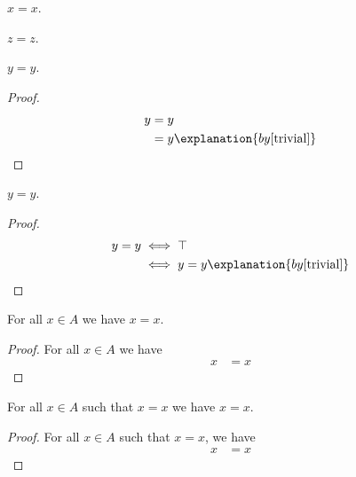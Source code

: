 \begin{proposition}\label{trivial}
    $x = x$.
\end{proposition}

\begin{proposition}\label{irrelevant}
    $z = z$.
\end{proposition}

\begin{proposition}\label{alsotrivial}
    $y = y$.
\end{proposition}
\begin{proof}
    \begin{align*}
        y
            &= y
                \\
            &= y
                \explanation{by \cref{trivial}}
    \end{align*}
\end{proof}

\begin{proposition}\label{trivial_biconditionals}
    $y = y$.
\end{proposition}
\begin{proof}
    \begin{align*}
        y = y
            &\iff \top
                \\
            &\iff y = y
                \explanation{by \cref{trivial}}
    \end{align*}
\end{proof}

\begin{proposition}\label{bounded_calc}
    For all $x \in A$ we have $x = x$.
\end{proposition}
\begin{proof}
    For all $x \in A$ we have
    \begin{align*}
        x
            &= x
    \end{align*}
\end{proof}

\begin{proposition}\label{bounded_calc_such_that}
    For all $x \in A$ such that $x = x$ we have $x = x$.
\end{proposition}
\begin{proof}
    For all $x \in A$ such that $x = x$, we have
    \begin{align*}
        x
            &= x
    \end{align*}
\end{proof}
